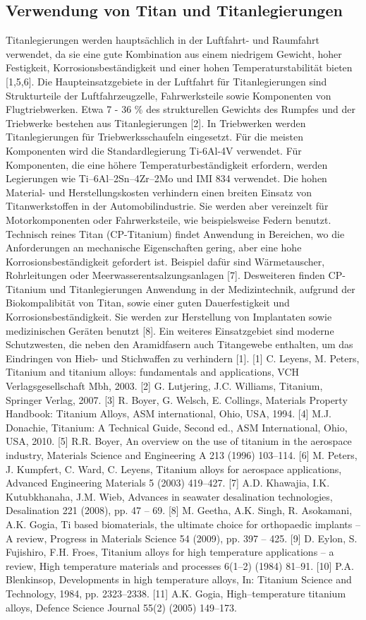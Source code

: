 \subsection{Verwendung von Titan und Titanlegierungen}
Titanlegierungen werden hauptsächlich in der Luftfahrt- und Raumfahrt verwendet, da sie eine gute Kombination aus einem niedrigem Gewicht, hoher Festigkeit, Korrosionsbeständigkeit und einer hohen Temperaturstabilität bieten [1,5,6]. Die Haupteinsatzgebiete in der Luftfahrt für Titanlegierungen sind Strukturteile der Luftfahrzeugzelle, Fahrwerksteile sowie Komponenten von Flugtriebwerken. Etwa 7 - 36 \% des strukturellen Gewichts des Rumpfes und der Triebwerke bestehen aus Titanlegierungen [2]. In Triebwerken werden Titanlegierungen für Triebwerksschaufeln eingesetzt. Für die meisten Komponenten wird die Standardlegierung Ti-6Al-4V verwendet. Für Komponenten, die eine höhere Temperaturbeständigkeit erfordern, werden Legierungen wie Ti–6Al–2Sn–4Zr–2Mo und IMI 834 verwendet. Die hohen Material- und Herstellungskosten verhindern einen breiten Einsatz von Titanwerkstoffen in der Automobilindustrie. Sie werden aber vereinzelt für Motorkomponenten oder Fahrwerksteile, wie beispielsweise Federn benutzt. Technisch reines Titan (CP-Titanium) findet Anwendung in Bereichen, wo die Anforderungen an mechanische Eigenschaften gering, aber eine hohe Korrosionsbeständigkeit gefordert ist. Beispiel dafür sind Wärmetauscher, Rohrleitungen oder Meerwasserentsalzungsanlagen [7]. Desweiteren finden CP-Titanium und Titanlegierungen Anwendung in der Medizintechnik, aufgrund der Biokompalibität von Titan, sowie einer guten Dauerfestigkeit und Korrosionsbeständigkeit. Sie werden zur Herstellung von Implantaten sowie medizinischen Geräten benutzt [8]. Ein weiteres Einsatzgebiet sind moderne Schutzwesten, die neben den Aramidfasern auch Titangewebe enthalten, um das Eindringen von Hieb- und Stichwaffen zu verhindern [1]. 
[1] C. Leyens, M. Peters, Titanium and titanium alloys: fundamentals and applications, VCH Verlagsgesellschaft Mbh, 2003. [2] G. Lutjering, J.C. Williams, Titanium, Springer Verlag, 2007. [3] R. Boyer, G. Welsch, E. Collings, Materials Property Handbook: Titanium Alloys, ASM international, Ohio, USA, 1994. [4] M.J. Donachie, Titanium: A Technical Guide, Second ed., ASM International, Ohio, USA, 2010. [5] R.R. Boyer, An overview on the use of titanium in the aerospace industry, Materials Science and Engineering A 213 (1996) 103–114. [6] M. Peters, J. Kumpfert, C. Ward, C. Leyens, Titanium alloys for aerospace applications, Advanced Engineering Materials 5 (2003) 419–427. [7] A.D. Khawajia, I.K. Kutubkhanaha, J.M. Wieb, Advances in seawater desalination technologies, Desalination 221 (2008), pp. 47 – 69. [8] M. Geetha, A.K. Singh, R. Asokamani, A.K. Gogia, Ti based biomaterials, the ultimate choice for orthopaedic implants – A review, Progress in Materials Science 54 (2009), pp. 397 – 425. [9] D. Eylon, S. Fujishiro, F.H. Froes, Titanium alloys for high temperature applications – a review, High temperature materials and processes 6(1–2) (1984) 81–91. [10] P.A. Blenkinsop, Developments in high temperature alloys, In: Titanium Science and Technology, 1984, pp. 2323–2338. [11] A.K. Gogia, High–temperature titanium alloys, Defence Science Journal 55(2) (2005) 149–173. 


